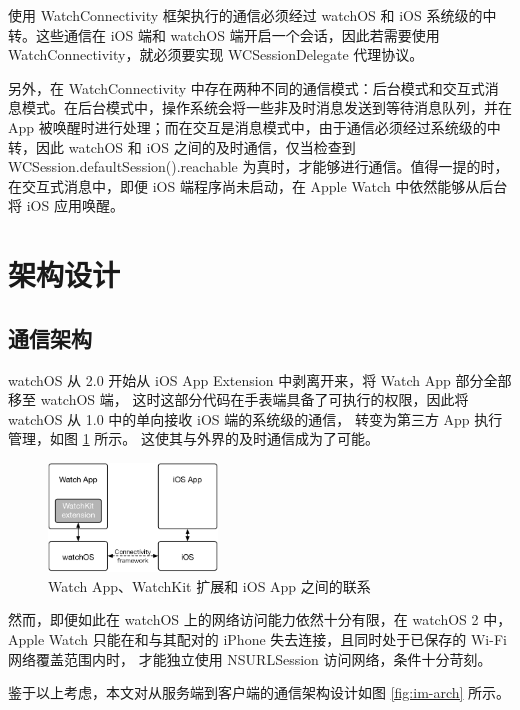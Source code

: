使用 WatchConnectivity 框架执行的通信必须经过 watchOS 和 iOS 系统级的中转。这些通信在 iOS 端和 watchOS 端开启一个会话，因此若需要使用 WatchConnectivity，就必须要实现 WCSessionDelegate 代理协议。

另外，在 WatchConnectivity 中存在两种不同的通信模式：后台模式和交互式消息模式。在后台模式中，操作系统会将一些非及时消息发送到等待消息队列，并在 App 被唤醒时进行处理；而在交互是消息模式中，由于通信必须经过系统级的中转，因此 watchOS 和 iOS 之间的及时通信，仅当检查到 WCSession.defaultSession().reachable 为真时，才能够进行通信。值得一提的时，在交互式消息中，即便 iOS 端程序尚未启动，在 Apple Watch 中依然能够从后台将 iOS 应用唤醒。

\section{架构设计}
\label{sec:arch-design}

\subsection{通信架构}
\label{sub:im-arch}

watchOS 从 2.0 开始从 iOS App Extension 中剥离开来，将 Watch App 部分全部移至 watchOS 端，
这时这部分代码在手表端具备了可执行的权限，因此将 watchOS 从 1.0 中的单向接收 iOS 端的系统级的通信，
转变为第三方 App 执行管理\cite{WatchGuide:2016}，如图 \ref{fig:watch-phone} 所示。
这使其与外界的及时通信成为了可能。

\begin{figure}[H]
    \kaishu
    \centering
    \includegraphics[width=0.4\textwidth]{figures/watch-phone}
    \caption{\kaishu Watch App、WatchKit 扩展和 iOS App 之间的联系}
    \label{fig:watch-phone}
\end{figure}

然而，即便如此在 watchOS 上的网络访问能力依然十分有限，在 watchOS 2 中，
Apple Watch 只能在和与其配对的 iPhone 失去连接，且同时处于已保存的 Wi-Fi 网络覆盖范围内时，
才能独立使用 NSURLSession 访问网络，条件十分苛刻。

鉴于以上考虑，本文对从服务端到客户端的通信架构设计如图 \ref{fig:im-arch} 所示。

